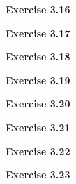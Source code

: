 \documentclass{article}
\begin{document}
\bigskip

\begin{framed}
    \noindent \textbf{Exercise 3.16}
    
    \medskip
    
    
\end{framed}

\bigskip

\begin{framed}
    \noindent \textbf{Exercise 3.17}
    
    \medskip
    
    
\end{framed}

\bigskip

\begin{framed}
    \noindent \textbf{Exercise 3.18}
    
    \medskip
    
    
\end{framed}

\bigskip

\begin{framed}
    \noindent \textbf{Exercise 3.19}
    
    \medskip
    
    
\end{framed}

\bigskip

\begin{framed}
    \noindent \textbf{Exercise 3.20}
    
    \medskip
    
    
\end{framed}

\bigskip

\begin{framed}
    \noindent \textbf{Exercise 3.21}
    
    \medskip
    
    
\end{framed}

\bigskip

\begin{framed}
    \noindent \textbf{Exercise 3.22}
    
    \medskip
    
    
\end{framed}

\bigskip

\begin{framed}
    \noindent \textbf{Exercise 3.23}
    
    \medskip
    
    
\end{framed}
\end{document}
